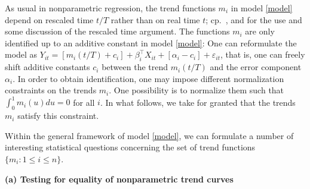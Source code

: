 \documentclass[a4paper,12pt]{article}
\begin{document}
As usual in nonparametric regression, the trend functions $m_i$ in model \eqref{model} depend on rescaled time $t/T$ rather than on real time $t$; cp.\ \cite{Robinson1989}, \cite{Dahlhaus1997} and \cite{VogtLinton2014} for the use and some discussion of the rescaled time argument. The functions $m_i$ are only identified up to an additive constant in model \eqref{model}: One can reformulate the model as $Y_{it} = [m_i(t/T) + c_i] + \beta_i^\top X_{it} + [\alpha_i - c_i] + \varepsilon_{it}$, that is, one can freely shift additive constants $c_i$ between the trend $m_i(t/T)$ and the error component $\alpha_i$. In order to obtain identification, one may impose different normalization constraints on the trends $m_i$. One possibility is to normalize them such that $\int_0^1 m_i(u) du = 0$ for all $i$. In what follows, we take for granted that the trends $m_i$ satisfy this constraint. 


Within the general framework of model \eqref{model}, we can formulate a number of interesting statistical questions concerning the set of trend functions $\{ m_i:  1 \le i \le n \}$. 

\vspace{10pt}


\noindent \textbf{(a) Testing for equality of nonparametric trend curves} 
\vspace{10pt} 
\end{document}
